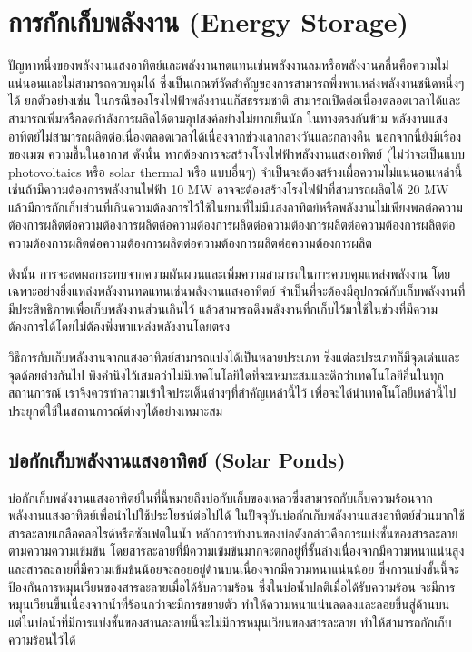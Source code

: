 \message{ !name(solar.tex)}\documentclass[
a4paper,
svgnames,
openany,
justified,
]{tufte-book}
\begin{document}
\chapter{การกักเก็บพลังงาน (Energy Storage)}

ปัญหาหนึ่งของพลังงานแสงอาทิตย์และพลังงานทดแทนเช่นพลังงานลมหรือพลังงานคลื่นคือความไม่แน่นอนและไม่สามารถควบคุมได้ ซึ่งเป็นเกณฑ์วัดสำคัญของการสามารถพึ่งพาแหล่งพลังงานชนิดหนึ่งๆได้ ยกตัวอย่างเช่น ในกรณีของโรงไฟฟ้าพลังงานแก็สธรรมชาติ สามารถเปิดต่อเนื่องตลอดเวลาได้และสามารถเพิ่มหรือลดกำลังการผลิดได้ตามอุปสงค์อย่างไม่ยากเย็นนัก ในทางตรงกันข้าม พลังงานแสงอาทิตย์ไม่สามารถผลิตต่อเนื่องตลอดเวลาได้เนื่องจากช่วงเลากลางวันและกลางคืน นอกจากนี้ยังมีเรื่องของเมฆ ความชื้นในอากาศ ดังนั้น หากต้องการจะสร้างโรงไฟฟ้าพลังงานแสงอาทิตย์ (ไม่ว่าจะเป็นแบบ photovoltaics หรือ solar thermal หรือ แบบอื่นๆ) จำเป็นจะต้องสร้างเผื่อความไม่แน่นอนเหล่านี้ เช่นถ้ามีความต้องการพลังงานไฟฟ้า 10 MW อาจจะต้องสร้างโรงไฟฟ้าที่สามารถผลิตได้ 20 MW แล้วมีการกักเก็บส่วนที่เกินความต้องการไว้ใช้ในยามที่ไม่มีแสงอาทิตย์หรือพลังงานไม่เพียงพอต่อความต้องการผลิตต่อความต้องการผลิตต่อความต้องการผลิตต่อความต้องการผลิตต่อความต้องการผลิตต่อความต้องการผลิตต่อความต้องการผลิตต่อความต้องการผลิตต่อความต้องการผลิต 

ดังนั้น การจะลดผลกระทบจากความผันผวนและเพิ่มความสามารถในการควบคุมแหล่งพลังงาน โดยเฉพาะอย่างยิ่งแหล่งพลังงานทดแทนเช่นพลังงานแสงอาทิตย์ จำเป็นที่จะต้องมีอุปกรณ์กับเก็บพลังงานที่มีประสิทธิภาพเพื่อเก็บพลังงานส่วนเกินไว้ แล้วสามารถดึงพลังงานที่กเก็บไว้มาใช้ในช่วงที่มีความต้องการได้โดยไม่ต้องพึ่งพาแหล่งพลังงานโดยตรง

วิธีการกับเก็บพลังงานจากแสงอาทิตย์สามารถแบ่งได้เป็นหลายประเภท ซึ่งแต่ละประเภทก็มีจุดเด่นและจุดด้อยต่างกันไป พึงคำนึงไว้เสมอว่าไม่มีเทคโนโลยีใดที่จะเหมาะสมและดีกว่าเทคโนโลยีอื่นในทุกสถานการณ์ เราจึงควรทำความเข้าใจประเด็นต่างๆที่สำคัญเหล่านี้ไว้ เพื่อจะได้นำเทคโนโลยีเหล่านี้ไปประยุกต์ใช้ในสถานการณ์ต่างๆได้อย่างเหมาะสม

\section{บ่อกักเก็บพลังงานแสงอาทิตย์ (Solar Ponds)}

บ่อกักเก็บพลังงานแสงอาทิตย์ในที่นี้หมายถึงบ่อกับเก็บของเหลวซึ่งสามารถกับเก็บความร้อนจากพลังงานแสงอาทิตย์เพื่อนำไปใช้ประโยชน์ต่อไปได้ ในปัจจุบันบ่อกักเก็บพลังงานแสงอาทิตย์ส่วนมากใช้สารละลายเกลือคลอไรด์หรือซัลเฟตในน้ำ หลักการทำงานของบ่อดังกล่าวคือการแบ่งชั้นของสารละลายตามความความเข้มข้น โดยสารละลายที่มีความเข้มข้นมากจะตกอยู่ที่ชั้นล่างเนื่องจากมีความหนาแน่นสูง และสารละลายที่มีความเข้มข้นน้อยจะลอยอยู่ด้านบนเนื่องจากมีความหนาแน่นน้อย ซึ่งการแบ่งชั้นนี้จะป้องกันการหมุนเวียนของสารละลายเมื่อได้รับความร้อน ซึ่งในบ่อน้ำปกติเมื่อได้รับความร้อน จะมีการหมุนเวียนขึ้นเนื่องจากน้ำที่ร้อนกว่าจะมีการขยายตัว ทำให้ความหนาแน่นลดลงและลอยขึ้นสู่ด้านบน แต่ในบ่อน้ำที่มีการแบ่งชั้นของสานละลายนี้จะไม่มีการหมุนเวียนของสารละลาย ทำให้สามารถกักเก็บความร้อนไว้ได้
\end{document}
